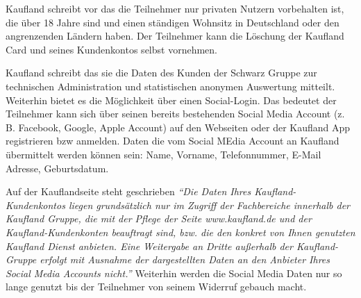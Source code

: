 \noindent Kaufland schreibt vor das die Teilnehmer nur privaten Nutzern vorbehalten ist, die über 18 Jahre sind und einen ständigen Wohnsitz in Deutschland oder den angrenzenden Ländern haben. Der Teilnehmer kann die Löschung der Kaufland Card und seines Kundenkontos selbst vornehmen. \cite{Kaufland_Datenschutz} \newline

\noindent Kaufland schreibt das sie die Daten des Kunden der Schwarz Gruppe zur technischen Administration und statistischen anonymen Auswertung mitteilt. Weiterhin bietet es die Möglichkeit über einen Social-Login. Das bedeutet der Teilnehmer kann sich über seinen bereits bestehenden Social Media Account (z. B. Facebook, Google, Apple Account) auf den Webseiten oder der Kaufland App registrieren bzw anmelden. Daten die vom Social MEdia Account an Kaufland übermittelt werden können sein: Name, Vorname, Telefonnummer, E-Mail Adresse, Geburtsdatum. \newline

\noindent Auf der Kauflandseite steht geschrieben \textit{``Die Daten Ihres Kaufland-Kundenkontos liegen grundsätzlich nur im Zugriff der Fachbereiche innerhalb der Kaufland Gruppe, die mit der Pflege der Seite www.kaufland.de und der Kaufland-Kundenkonten beauftragt sind, bzw. die den konkret von Ihnen genutzten Kaufland Dienst anbieten. Eine Weitergabe an Dritte außerhalb der Kaufland-Gruppe erfolgt mit Ausnahme der dargestellten Daten an den Anbieter Ihres Social Media Accounts nicht.'' \cite{Kaufland_Rechtliches}} Weiterhin werden die Social Media Daten nur so lange genutzt bis der Teilnehmer von seinem Widerruf gebauch macht.